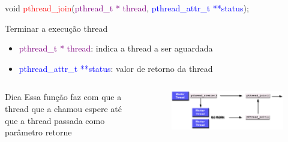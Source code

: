 \documentclass[10pt, xcolor=x11names]{beamer}
\begin{document}
\begin{frame}

void \textcolor{red}{pthread\_join}(\textcolor{purple}{pthread\_t * thread}, \textcolor{blue}{pthread\_attr\_t **status});

	\begin{block}{Terminar a execução thread}
		\begin{itemize}
			\item \textcolor{purple}{pthread\_t * thread}: indica a thread a ser aguardada
			\item \textcolor{blue}{pthread\_attr\_t **status}: valor de retorno da thread
		\end{itemize}
	\end{block}

	\begin{columns}
			\begin{alertblock}{Dica}
				Essa função faz com que a thread que a chamou espere até que a thread passada como parâmetro retorne
			\end{alertblock}

		

		\begin{flushright}
			\begin{figure}
				\includegraphics[width=1.1\linewidth]{img/joining.png}
			\end{figure}
		\end{flushright}	
		
	\end{columns}

	
\end{frame}


\end{document}
